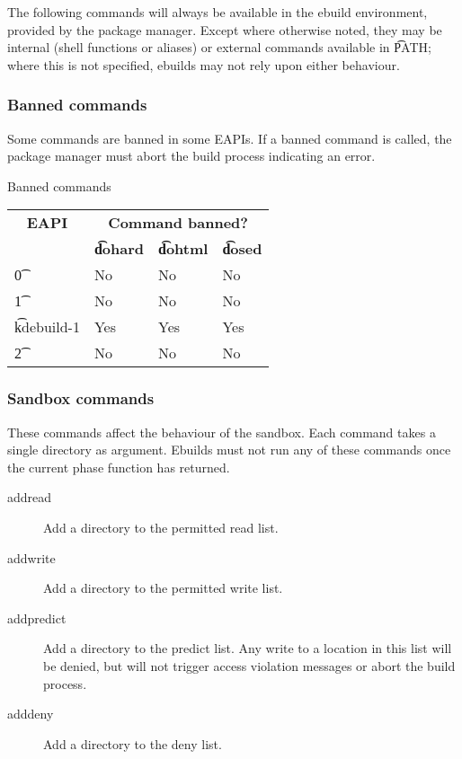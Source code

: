 \label{pkg-mgr-commands}

The following commands will always be available in the ebuild environment, provided by the package
manager. Except where otherwise noted, they may be internal (shell functions or aliases) or external
commands available in \t{PATH}; where this is not specified, ebuilds may not rely upon either
behaviour.

\IFKDEBUILDELSE
{
    \subsubsection{Banned commands}
    \label{banned-commands}

    Some commands are banned in some EAPIs. If a banned command is called, the package manager must
    abort the build process indicating an error.

    \begin{centertable}{Banned commands} \label{banned-commands-table}
    \begin{tabular}{ l l l l }
        \toprule
        \multicolumn{1}{c}{\textbf{EAPI}} &
        \multicolumn{3}{c}{\textbf{Command banned?}} \\
        \multicolumn{1}{c}{} &
        \multicolumn{1}{c}{\textbf{\t{dohard}}} &
        \multicolumn{1}{c}{\textbf{\t{dohtml}}} &
        \multicolumn{1}{c}{\textbf{\t{dosed}}} \\
        \midrule
    \t{0} & No & No & No \\
    \t{1} & No & No & No \\
    \t{kdebuild-1} & Yes & Yes & Yes \\
    \t{2} & No & No & No \\
    \bottomrule
    \end{tabular}
    \end{centertable}
}{
}

\subsubsection{Sandbox commands}
These commands affect the behaviour of the sandbox. Each command takes a single directory as
argument. Ebuilds must not run any of these commands once the current phase function has returned.
\begin{description}
\item[addread] Add a directory to the permitted read list.
\item[addwrite] Add a directory to the permitted write list.
\item[addpredict] Add a directory to the predict list. Any write to a location in this list will be
    denied, but will not trigger access violation messages or abort the build process.
\item[adddeny] Add a directory to the deny list.
\end{description}

